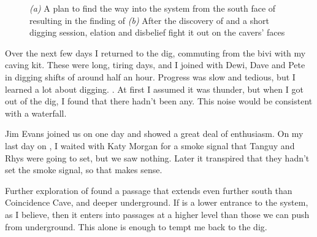 \begin{figure}[t!]
        \caption{
            \textsl{(a)} A plan to find the way into the system from the south face of  resulting in the finding of  
            \textsl{(b)} After the discovery of  and a short digging session, elation and disbelief fight it out on the cavers' faces }
        \label{}

    \end{figure}

	Over the next few days I returned to the dig, commuting from the bivi with my caving kit. These were long, tiring days, and I joined with Dewi, Dave and Pete in digging shifts of around half an hour. Progress was slow and tedious, but I learned a lot about digging. . At first I assumed it was thunder, but when I got out of the dig, I found that there hadn't been any. This noise would be consistent with a waterfall.

    Jim Evans joined us on one day and showed a great deal of enthusiasm. On my last day on , I waited with Katy Morgan for a smoke signal that Tanguy and Rhys were going to set, but we saw nothing. Later it transpired that they hadn't set the smoke signal, so that makes sense.

    Further exploration of  found a passage that extends even further south than Coincidence Cave, and deeper underground. If  is a lower entrance to the system, as I believe, then it enters into passages at a higher level than those we can push from underground. This alone is enough to tempt me back to the dig.

